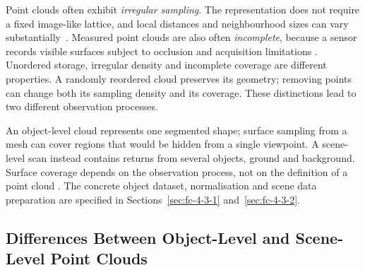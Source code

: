 Point clouds often exhibit \emph{irregular sampling}. The representation
does not require a fixed image-like lattice, and local distances and
neighbourhood sizes can vary substantially~\cite{qi2017pointnetpp}.
Measured point clouds are also often \emph{incomplete}, because a sensor
records visible surfaces subject to occlusion and acquisition limitations
\cite{geiger2013kitti}. Unordered storage, irregular density and incomplete
coverage are different properties. A randomly reordered cloud preserves
its geometry; removing points can change both its sampling density and its
coverage. These distinctions lead to two different observation processes.

An object-level cloud represents one segmented shape; surface sampling
from a mesh can cover regions that would be hidden from a single viewpoint.
A scene-level scan instead contains returns from several objects, ground
and background. Surface coverage depends on the observation process, not
on the definition of a point cloud
\cite{wu2015modelnet,geiger2013kitti,qi2017pointnet}.
The concrete object dataset, normalisation and scene data preparation are
specified in Sections~\ref{sec:fc-4-3-1} and~\ref{sec:fc-4-3-2}.

\subsection{Differences Between Object-Level and Scene-Level Point Clouds}
\label{subsec:domain_gap}

